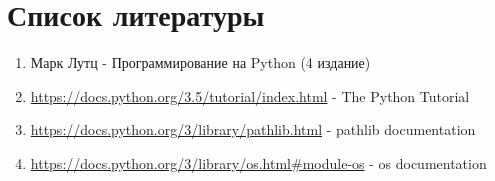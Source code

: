 \documentclass[12pt]{article}
\begin{document}
\section{Список литературы}
\begin{enumerate}
\item Марк Лутц - Программирование на Python (4 издание)
\item \url{https://docs.python.org/3.5/tutorial/index.html} - The Python Tutorial
\item \url{https://docs.python.org/3/library/pathlib.html} - pathlib documentation
\item \url{https://docs.python.org/3/library/os.html#module-os} - os documentation
\end{enumerate}
\end{document}
